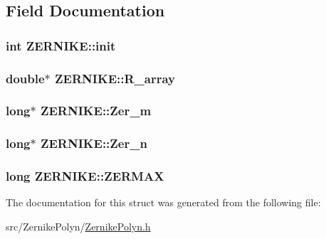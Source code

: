 \subsection{Field Documentation}
\hypertarget{structZERNIKE_aac9ea666bbfdae8b71b4bff01617b2c2}{
\subsubsection[{init}]{\setlength{\rightskip}{0pt plus 5cm}int Z\+E\+R\+N\+I\+K\+E\+::init}}\label{structZERNIKE_aac9ea666bbfdae8b71b4bff01617b2c2}
\hypertarget{structZERNIKE_ab54550ba1f67c3f7d31c9079dace1aa8}{
\subsubsection[{R\+\_\+array}]{\setlength{\rightskip}{0pt plus 5cm}double$\ast$ Z\+E\+R\+N\+I\+K\+E\+::\+R\+\_\+array}}\label{structZERNIKE_ab54550ba1f67c3f7d31c9079dace1aa8}
\hypertarget{structZERNIKE_a92c691d4081cb095e8f006335bf20f08}{
\subsubsection[{Zer\+\_\+m}]{\setlength{\rightskip}{0pt plus 5cm}long$\ast$ Z\+E\+R\+N\+I\+K\+E\+::\+Zer\+\_\+m}}\label{structZERNIKE_a92c691d4081cb095e8f006335bf20f08}
\hypertarget{structZERNIKE_a9c1c566a6926ec5c5458614732c6d358}{
\subsubsection[{Zer\+\_\+n}]{\setlength{\rightskip}{0pt plus 5cm}long$\ast$ Z\+E\+R\+N\+I\+K\+E\+::\+Zer\+\_\+n}}\label{structZERNIKE_a9c1c566a6926ec5c5458614732c6d358}
\hypertarget{structZERNIKE_a2c37fde142f459b1374da2472151ee29}{
\subsubsection[{Z\+E\+R\+M\+A\+X}]{\setlength{\rightskip}{0pt plus 5cm}long Z\+E\+R\+N\+I\+K\+E\+::\+Z\+E\+R\+M\+A\+X}}\label{structZERNIKE_a2c37fde142f459b1374da2472151ee29}


The documentation for this struct was generated from the following file\+:\begin{DoxyCompactItemize}
\item 
src/\+Zernike\+Polyn/\hyperlink{ZernikePolyn_8h}{Zernike\+Polyn.\+h}\end{DoxyCompactItemize}
